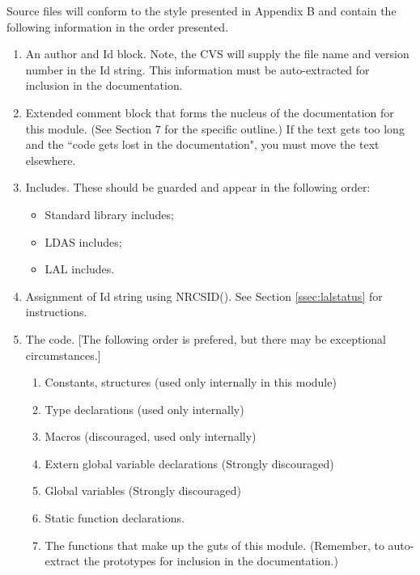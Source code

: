 \documentclass[]{ligodcc}
\begin{document}
Source files will conform to the style presented in  Appendix B and
contain the following information in the order presented.

\begin{enumerate}
\item
An author and Id block. Note, the CVS will supply the file
name and version number in the Id string. This information must be
auto-extracted for inclusion in the documentation.

\item
Extended comment block that forms the nucleus of the
documentation for this module. (See Section 7 for the specific
outline.) If the text gets too long and the ``code gets lost in the
documentation", you must move the text elsewhere. 

\item
Includes. These should be guarded and appear in the following
order:
\begin{itemize}
   \item Standard library includes;
   \item LDAS includes; 
   \item LAL includes.
\end{itemize}

\item
Assignment of Id string using NRCSID().  See Section
\ref{ssec:lalstatus} for
instructions.

\item
The code.  [The following order is prefered, but there may be
exceptional circumstances.]

\begin{enumerate}
   \item
   Constants, structures (used only internally in this module)
   \item
   Type declarations (used only internally)
   \item
   Macros (discouraged, used only internally)
   \item
   Extern global variable declarations (Strongly discouraged)
   \item
   Global variables (Strongly discouraged)
   \item
   Static function declarations.
   \item
   The functions that make up the guts of this module.  (Remember, to
   auto-extract the prototypes for inclusion in the documentation.)
\end{enumerate}
\end{enumerate}
\end{document}
